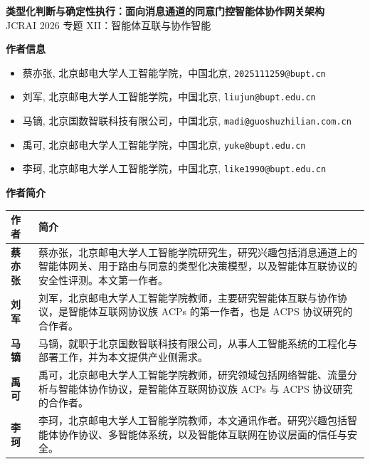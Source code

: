 \documentclass[11pt,a4paper]{article}
\begin{document}
\begin{center}{\Large\bfseries 类型化判断与确定性执行：面向消息通道的同意门控智能体协作网关架构}\\[0.6em]
JCRAI 2026 专题 XII：智能体互联与协作智能
\end{center}
\vspace{1em}
{\bfseries 作者信息}
\begin{itemize}\setlength{\itemsep}{0.1em}\setlength{\parskip}{0em}
\item 蔡亦张, 北京邮电大学人工智能学院，中国北京, \texttt{2025111259@bupt.cn}
\item 刘军, 北京邮电大学人工智能学院，中国北京, \texttt{liujun@bupt.edu.cn}
\item 马镝, 北京国数智联科技有限公司，中国北京, \texttt{madi@guoshuzhilian.com.cn}
\item 禹可, 北京邮电大学人工智能学院，中国北京, \texttt{yuke@bupt.edu.cn}
\item 李珂, 北京邮电大学人工智能学院，中国北京, \texttt{like1990@bupt.edu.cn}
\end{itemize}
\vspace{1em}
{\bfseries 作者简介}
\begin{longtable}{@{}p{3.4cm}p{10.8cm}@{}}
\hline
\textbf{作者} & \textbf{简介} \\[0.3em]
\hline
\endhead
{\bfseries 蔡亦张} & {\footnotesize 蔡亦张，北京邮电大学人工智能学院研究生，研究兴趣包括消息通道上的智能体网关、用于路由与同意的类型化决策模型，以及智能体互联协议的安全性评测。本文第一作者。} \\[0.4em] \hline
{\bfseries 刘军} & {\footnotesize 刘军，北京邮电大学人工智能学院教师，主要研究智能体互联与协作协议，是智能体互联网协议族 ACPs 的第一作者，也是 ACPS 协议研究的合作者。} \\[0.4em] \hline
{\bfseries 马镝} & {\footnotesize 马镝，就职于北京国数智联科技有限公司，从事人工智能系统的工程化与部署工作，并为本文提供产业侧需求。} \\[0.4em] \hline
{\bfseries 禹可} & {\footnotesize 禹可，北京邮电大学人工智能学院教师，研究领域包括网络智能、流量分析与智能体协作协议，是智能体互联网协议族 ACPs 与 ACPS 协议研究的合作者。} \\[0.4em] \hline
{\bfseries 李珂} & {\footnotesize 李珂，北京邮电大学人工智能学院教师，本文通讯作者。研究兴趣包括智能体协作协议、多智能体系统，以及智能体互联网在协议层面的信任与安全。} \\[0.4em] \hline
\end{longtable}
\end{document}
